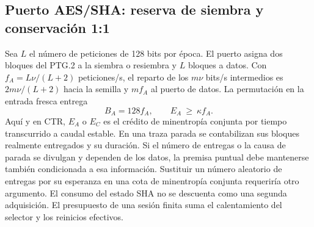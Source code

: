 \subsection{Puerto AES/SHA: reserva de siembra y conservación 1:1}
\label{sec:port-rate-ais}
Sea \(L\) el número de peticiones de 128 bits por época. El puerto asigna
dos bloques del PTG.2 a la siembra o resiembra y \(L\) bloques a datos.
Con \(f_A=L\nu/(L+2)\) peticiones/s, el reparto de los \(m\nu\)
bits/s intermedios es \(2m\nu/(L+2)\) hacia la semilla y \(mf_A\) al
puerto de datos. La permutación en la entrada fresca entrega
\[
 B_A=128 f_A,\qquad E_A\ \ge\ \kappa f_A.
\]
Aquí y en CTR, \(E_A\) o \(E_C\) es el crédito de minentropía conjunta
por tiempo transcurrido a caudal estable. En una traza parada se contabilizan
sus bloques realmente entregados y su duración. Si el número de entregas o
la causa de parada se divulgan y dependen de los datos, la premisa puntual
debe mantenerse también condicionada a esa información. Sustituir un número
aleatorio de entregas por su esperanza en una cota de minentropía conjunta
requeriría otro argumento. El consumo del estado SHA
no se descuenta como una segunda adquisición. El presupuesto de una sesión
finita suma el calentamiento del selector y los reinicios efectivos.

